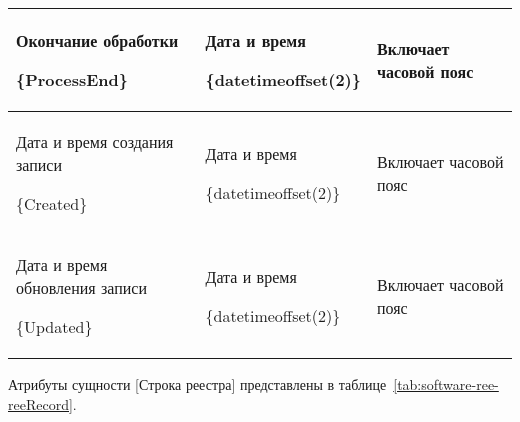 \begin{myTable}
\begin{longtable}[h]{|p{}|p{}|p{}|}
	Окончание обработки \par \{ProcessEnd\} & Дата и время \par \{datetimeoffset(2)\} & Включает часовой пояс \\ \hline
	Дата и время создания записи \par \{Created\} & Дата и время \par \{datetimeoffset(2)\} & Включает часовой пояс \\ \hline
	Дата и время обновления записи \par \{Updated\} & Дата и время \par \{datetimeoffset(2)\} & Включает часовой пояс \\ \hline
\end{longtable}
\end{myTable}

Атрибуты сущности [Строка реестра] представлены в таблице~\ref{tab:software-ree-reeRecord}.

